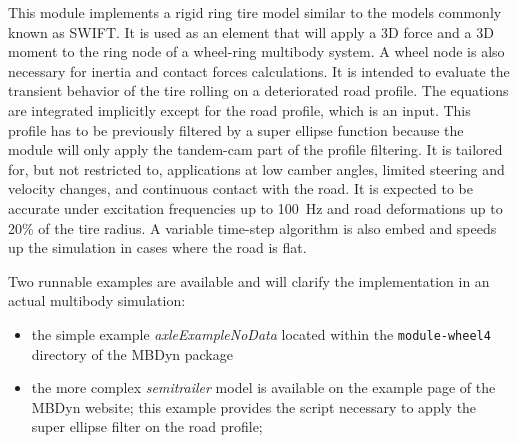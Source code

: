 \noindent
This module implements a rigid ring tire model similar to the models commonly known as SWIFT. It is used as an element that will apply a 3D force and a 3D moment to the ring node of a wheel-ring multibody system. A wheel node is also necessary for inertia and contact forces calculations. It is intended to evaluate the transient behavior of the tire rolling on a deteriorated road profile. The equations are integrated implicitly except for the road profile, which is an input. This profile has to be previously filtered by a super ellipse function because the  module will only apply the tandem-cam part of the profile filtering. It is tailored for, but not restricted to, applications at low camber angles, limited steering and velocity changes, and continuous contact with the road. It is expected to be accurate under excitation frequencies up to 100~Hz and road deformations up to 20\% of the tire radius. A variable time-step algorithm is also embed and speeds up the simulation in cases where the road is flat.

Two runnable examples are available and will clarify the implementation in an actual multibody simulation:
\begin{itemize}
\item the simple example \textit{axleExampleNoData} located within the \texttt{module-wheel4} directory of the MBDyn package
\item the more complex \textit{semitrailer} model is available on the example page of the MBDyn website; this example provides the script necessary to apply the super ellipse filter on the road profile; 
\end{itemize}

